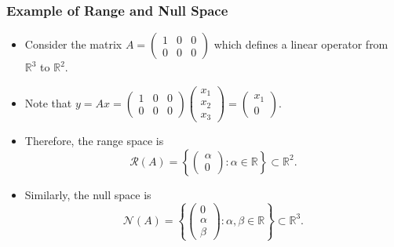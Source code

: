 \documentclass{beamer}
\begin{document}
\begin{frame}\frametitle{Example of Range and Null Space}
\begin{itemize}
\item Consider the matrix $A=\begin{pmatrix} 1 & 0 & 0\\ 0 & 0 & 0 \end{pmatrix}$ which defines a linear operator from $\mathbb{R}^3$ to $\mathbb{R}^2$.
\item Note that $y=Ax = 	\begin{pmatrix} 1 & 0 & 0 \\ 0 & 0 & 0 \end{pmatrix}\begin{pmatrix} x_1 \\ x_2 \\ x_3 \end{pmatrix} = \begin{pmatrix} x_1 \\ 0 \end{pmatrix}$.
\item Therefore, the range space is
	\[
	\mathcal{R}(A) = \left\{\begin{pmatrix}\alpha \\ 0 \end{pmatrix} : \alpha\in\mathbb{R} \right\} \subset \mathbb{R}^2.
	\]
\item Similarly, the null space is
	\[
	\mathcal{N}(A) = \left\{\begin{pmatrix}0 \\ \alpha \\ \beta \end{pmatrix} : \alpha, \beta\in\mathbb{R} \right\}\subset \mathbb{R}^3.
	\]
\end{itemize}
\end{frame}
\end{document}
